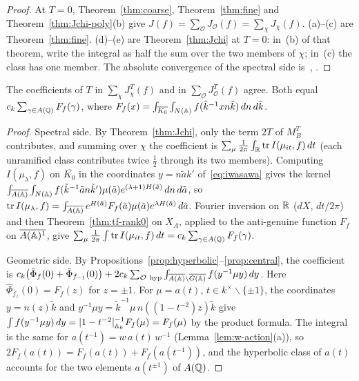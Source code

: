 \begin{proof}
At $T=0$, Theorem~\ref{thm:coarse}, Theorem~\ref{thm:fine} and
Theorem~\ref{thm:Jchi-poly}(b) give $J(f)=\sum_{\mathcal O}J_{\mathcal O}(f)
=\sum_\chi J_\chi(f)$. (a)--(c) are Theorem~\ref{thm:fine}. (d)--(e) are
Theorem~\ref{thm:Jchi} at $T=0$: in~(b) of that theorem, write the
integral as half the sum over the two members of $\chi$; in~(c) the class
has one member. The absolute convergence of the spectral side
is~\cite{Ar80}, \cite{Li13}.
\end{proof}

\begin{proposition}\label{prop:Tcoef}
The coefficients of $T$ in $\sum_\chi J^T_\chi(f)$ and in
$\sum_{\mathcal O}J^T_{\mathcal O}(f)$ agree. Both equal
$c_k\sum_{\gamma\in A(\mathbb{Q})}F_f(\gamma)$, where $F_f(x)=\int_{\overline{K_0}}
\int_{N(\mathbb{A})}f(\tilde k^{-1}xn\tilde k)\,dn\,d\tilde k$.
\end{proposition}

\begin{proof}
Spectral side. By Theorem~\ref{thm:Jchi}, only the term $2T$ of $M_B^T$
contributes, and summing over $\chi$ the coefficient is
$\sum_\mu\frac1{2\pi}\int_{\mathbb{R}}\operatorname{tr}I(\mu_{it},f)\,dt$ (each
unramified class contributes twice $\frac12$ through its two members).
Computing $I(\mu_\lambda,f)$ on $\overline{K_0}$ in the coordinates
$y=n\tilde ak'$ of~\eqref{eq:iwasawa} gives the kernel
$\int_{\overline{A(\mathbb{A})}}\int_{N(\mathbb{A})}f(\tilde k^{-1}\tilde an\tilde k')\mu(\tilde
a)e^{(\lambda+1)H(\tilde a)}\,dn\,d\tilde a$, so $\operatorname{tr}
I(\mu_\lambda,f)=\int_{\overline{A(\mathbb{A})}}e^{H(\tilde a)}F_f(\tilde a)
\mu(\tilde a)e^{\lambda H(\tilde a)}\,d\tilde a$. Fourier inversion on $\mathbb{R}$
($dX$, $dt/2\pi$) and then Theorem~\ref{thm:tf-rank0} on $X_A$, applied
to the anti-genuine function $F_f$ on $\overline{A(\mathbb{A})^1}$, give
$\sum_\mu\frac1{2\pi}\int\operatorname{tr}I(\mu_{it},f)\,dt=c_k\sum_{\gamma\in
A(\mathbb{Q})}F_f(\gamma)$.

Geometric side. By Propositions~\ref{prop:hyperbolic}--\ref{prop:central},
the coefficient is $c_k\bigl(\hat\Phi_f(0)+\hat\Phi_{f_{-1}}(0)\bigr)
+2c_k\sum_{\mathcal O\ \mathrm{hyp}}\int_{\overline{A(\mathbb{A})}\backslash\overline{G(\mathbb{A})}}
f(y^{-1}\mu y)\,dy$. Here $\hat\Phi_{f_z}(0)=F_f(z)$ for $z=\pm1$. For
$\mu=a(t)$, $t\in k^\times\smallsetminus\{\pm1\}$, the coordinates
$y=n(z)\tilde k$ and $y^{-1}\mu y=\tilde k^{-1}\mu\,n((1-t^{-2})z)\tilde k$
give $\int f(y^{-1}\mu y)\,dy=|1-t^{-2}|_{\mathbb{A}_k}^{-1}F_f(\mu)=F_f(\mu)$ by the
product formula. The integral is the same for $a(t^{-1})=w\,a(t)\,w^{-1}$
(Lemma~\ref{lem:w-action}(a)), so $2F_f(a(t))=F_f(a(t))+F_f(a(t^{-1}))$,
and the hyperbolic class of $a(t)$ accounts for the two elements
$a(t^{\pm1})$ of $A(\mathbb{Q})$.
\end{proof}

